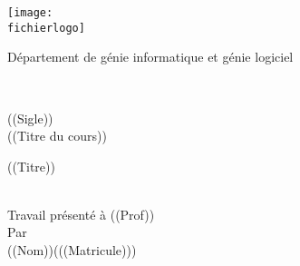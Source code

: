 \documentclass[12pt,titlepage]{article}
\newcommand{\letitre}{((Titre))}
\newcommand{\presentea}{((Prof))}
\newcommand{\fichierlogo}{logo_poly.pdf}
\newcommand{\organisation}{Département de génie informatique et génie logiciel}
\newcommand{\lesiglecours}{((Sigle))}
\newcommand{\letitrecours}{((Titre du cours))}
\newcommand{\lematricule}{((Matricule))}
\newcommand{\lauteur}{((Nom))}
\begin{document}
\begin{titlepage}

\parbox[c]{1in}{\texttt{[image: \\fichierlogo]}}
\hfill \parbox[c]{3in}{\Large\raggedleft\organisation} \\
%
%
\begin{center}
\vfill
%
%
%
\large
\lesiglecours \\
\letitrecours
%
%
\vfill
%
%
\parbox[b]{0.6\textwidth}{\center\letitre\\}\\
%
{\small Travail présenté à
\presentea\\}
%
\vfill
Par\\
\lauteur (\lematricule)

\end{center}
\end{titlepage}
\end{document}
